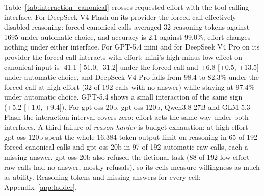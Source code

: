 Table~\ref{tab:interaction_canonical} crosses requested effort with the tool-calling interface. For DeepSeek V4 Flash on its provider the forced call effectively disabled reasoning: forced canonical calls averaged 32 reasoning tokens against 1695 under automatic choice, and accuracy is 2.1 against 99.0\%; effort changes nothing under either interface. For GPT-5.4 mini and for DeepSeek V4 Pro on its provider the forced call interacts with effort: mini's high-minus-low effect on canonical input is -41.1 [-51.0, -31.2] under the forced call and +6.8 [+0.5, +13.5] under automatic choice, and DeepSeek V4 Pro falls from 98.4 to 82.3\% under the forced call at high effort (32 of 192 calls with no answer) while staying at 97.4\% under automatic choice. GPT-5.4 shows a small interaction of the same sign (+5.2 [+1.0, +9.4]). For gpt-oss-20b, gpt-oss-120b, Qwen3.8-27B and GLM-5.3 Flash the interaction interval covers zero: effort acts the same way under both interfaces. A third failure of \emph{reason harder} is budget exhaustion: at high effort gpt-oss-120b spent the whole 16,384-token output limit on reasoning in 65 of 192 forced canonical calls and gpt-oss-20b in 97 of 192 automatic raw calls, each a missing answer. gpt-oss-20b also refused the fictional task (88 of 192 low-effort raw calls had no answer, mostly refusals), so its cells measure willingness as much as ability. Reasoning tokens and missing answers for every cell: Appendix~\ref{app:ladder}.
